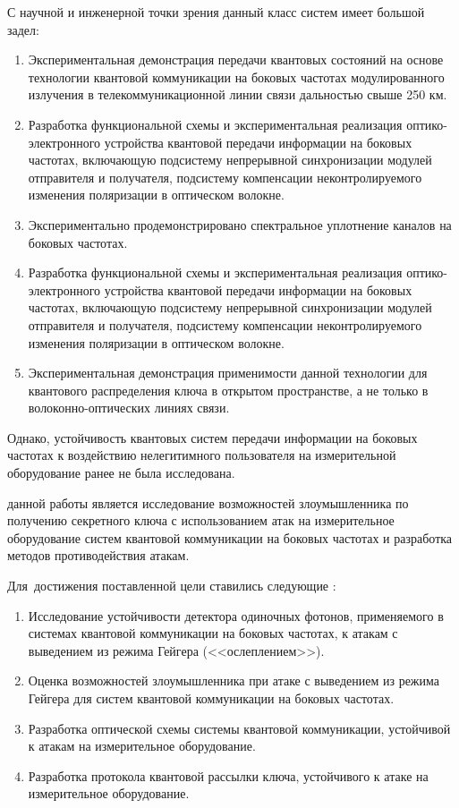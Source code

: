 С научной и инженерной точки зрения данный класс систем имеет большой задел:

\begin{enumerate}
	\item Экспериментальная демонстрация передачи квантовых состояний на основе технологии квантовой коммуникации на боковых частотах модулированного излучения в телекоммуникационной линии связи дальностью свыше 250 км. 
	\item Разработка функциональной схемы и экспериментальная реализация оптико-электронного устройства квантовой передачи информации на боковых частотах, включающую подсистему непрерывной синхронизации модулей отправителя и получателя, подсистему компенсации неконтролируемого изменения поляризации в оптическом волокне.
	\item Экспериментально продемонстрировано спектральное уплотнение каналов на боковых частотах. 
	\item Разработка функциональной схемы и экспериментальная реализация оптико-электронного устройства квантовой передачи информации на боковых частотах, включающую подсистему непрерывной синхронизации модулей отправителя и получателя, подсистему компенсации неконтролируемого изменения поляризации в оптическом волокне.
	\item Экспериментальная демонстрация применимости данной технологии для квантового распределения ключа в открытом пространстве, а не только в волоконно-оптических линиях связи. 
\end{enumerate}


Однако, устойчивость квантовых систем передачи информации на боковых частотах к воздействию нелегитимного пользователя на измерительной оборудование ранее не была исследована. 


{\aim} данной работы является исследование возможностей злоумышленника по получению секретного ключа с использованием атак на измерительное оборудование систем квантовой коммуникации на боковых частотах и разработка методов противодействия атакам.


Для~достижения поставленной цели ставились следующие {\tasks}:
\begin{enumerate}
  \item Исследование устойчивости детектора одиночных фотонов, применяемого в системах квантовой коммуникации на боковых частотах, к атакам с выведением из режима Гейгера (<<ослеплением>>). 

  \item Оценка возможностей злоумышленника при атаке с выведением из режима Гейгера для систем квантовой коммуникации на боковых частотах. 

  \item Разработка оптической схемы системы квантовой коммуникации, устойчивой к атакам на измерительное оборудование. 

  \item Разработка протокола квантовой рассылки ключа, устойчивого к атаке на измерительное оборудование. 

\end{enumerate}
